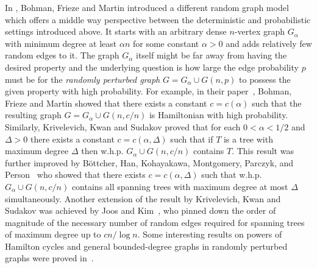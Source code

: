 \documentclass[10pt, a4paper]{article}
\theoremstyle{remark}
\begin{document}
In \cite{bohman_perturbed}, Bohman, Frieze and Martin introduced a different random graph model which offers a middle way perspective between the deterministic and probabilistic settings introduced above.
It starts with an arbitrary dense $n$-vertex graph $G_\alpha$ with minimum degree at least $\alpha n$ for some constant $\alpha >0$ and adds relatively few random edges to it.
The graph $G_\alpha$ itself might be far away from having the desired property and the underlying question is how large the edge probability $p$ must be for the \emph{randomly perturbed graph} $G = G_\alpha \cup G(n,p)$ to possess the given property with high probability.
For example, in their paper~\cite{bohman_perturbed}, Bohman, Frieze and Martin showed that there exists a constant $c = c(\alpha)$ such that the resulting graph $G = G_\alpha \cup G(n, c/n)$ is Hamiltonian with high probability.
Similarly, Krivelevich, Kwan and Sudakov \cite{krivelevich_bounded-degree_2016} proved that for each $0 < \alpha < 1/2$ and $\Delta > 0$ there exists a constant $c = c(\alpha, \Delta)$ such that if $T$ is a tree with maximum degree $\Delta$ then w.h.p. $G_\alpha \cup G(n, c/n)$ contains $T$.
This result was further improved by Böttcher, Han, Kohayakawa, Montgomery, Parczyk, and Person~\cite{undirected_spanning_universality} who showed that there exists $c = c(\alpha, \Delta)$ such that w.h.p. $G_\alpha \cup G(n, c/n)$ contains all spanning trees with maximum degree at most $\Delta$ simultaneously. Another extension of the result by Krivelevich, Kwan and Sudakov was achieved by Joos and Kim~\cite{joos2020spanning}, who pinned down the order of magnitude of the necessary number of random edges required for spanning trees of maximum degree up to $cn/\log{n}$. Some interesting results on powers of Hamilton cycles and general bounded-degree graphs in randomly perturbed graphs were proved in~\cite{bottcher2020embedding}.
\end{document}
